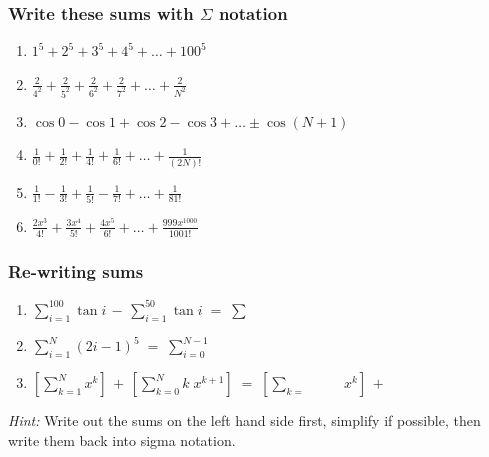 \documentclass[14pt]{beamer}
\begin{document}
\begin{frame}[t]
	\fontsize{13}{13}\selectfont
	\frametitle{Write these sums with $\Sigma$ notation}

	\begin{enumerate}
		\item $\displaystyle 1^{5}+ 2^{5}+ 3^{5}+ 4^{5}+ \ldots + 100^{5}$
			\vfill

		\item $\displaystyle \frac{2}{4^{2}}+ \frac{2}{5^{2}}+ \frac{2}{6^{2}}+ \frac{2}{7^{2}}
			+ \ldots + \frac{2}{N^{2}}$
			\vfill

		\item $\displaystyle \cos 0 - \cos 1 + \cos 2 - \cos 3 + %
			\ldots \pm \cos (N+1)$
			\vfill

		\item $\displaystyle \frac{1}{0!}+ \frac{1}{2!}+ \frac{1}{4!}+ \frac{1}{6!}+
			\ldots + \frac{1}{(2N)!}$
			\vfill

		\item $\displaystyle \frac{1}{1!}- \frac{1}{3!}+ \frac{1}{5!}- \frac{1}{7!}+
			\ldots + \frac{1}{81!}$
			\vfill

		\item $\displaystyle \frac{2x^{3}}{ 4!}+ \frac{3x^{4}}{5!}+ \frac{4x^{5}}{6!}
			+ \ldots + \frac{999x^{1000}}{1001!}$
	\end{enumerate}
\end{frame}

\begin{frame}[t]
	\fontsize{13}{13}\selectfont
	\frametitle{Re-writing sums}

	\begin{enumerate}
		\item $\displaystyle \sum_{i=1}^{100}\tan i \, - \, \sum_{i=1}^{50}\tan i \;
			= \; \sum_{\boxed{\phantom{???}}}^{\boxed{\phantom{???}}}\boxed{\phantom{?????^f_p}}$
			\vfill

		\item $\displaystyle \sum_{i=1}^{N}(2i-1)^{5}\; = \; \sum_{i=0}^{N-1}\boxed{\phantom{?????^f_p}}$
			\vfill

		\item $\displaystyle \left[ \sum_{k=1}^{N}x^{k}\right] \, + \, \left[ \sum_{k=0}
			^{N}k \; x^{k+1}\right] \; = \; \left[ \sum_{k=\boxed{\phantom{???}}}^{\boxed{\phantom{???}}}
			\!\!\boxed{\phantom{???}}\,x^{k}\right] \, + \, \boxed{\phantom{???}}$
			\vfill
	\end{enumerate}

	\emph{Hint:} Write out the sums on the left hand side first, simplify if
	possible, then write them back into sigma notation.
\end{frame}
\end{document}
